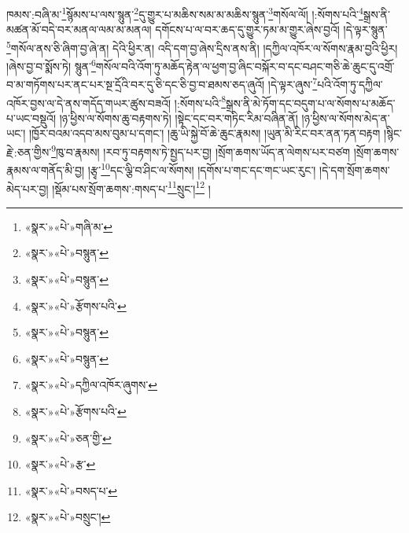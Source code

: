 ཁམས་:བཞི་མ་\footnote{«སྣར་»«པེ་»གཞི་མ་}སྙོམས་པ་ལས་སྙུན་\footnote{«སྣར་»«པེ་»བསྙུན་}དུ་གྱུར་པ་མཆིས་སམ་མ་མཆིས་སྙུན་\footnote{«སྣར་»«པེ་»བསྙུན་}གསོལ་ལོ། །:སོགས་པའི་\footnote{«སྣར་»«པེ་»རྩོགས་པའི་}སྒྲས་ནི་མཚན་མོ་བདེ་བར་མནལ་ལམ་མ་མནལ། དགོངས་པ་ལ་བར་ཆད་དུ་གྱུར་ཏམ་མ་གྱུར་ཞེས་བྱའོ། །དེ་ལྟར་སྙུན་\footnote{«སྣར་»«པེ་»བསྙུན་}གསོལ་ནས་ཅི་ཞིག་བྱ་ཞེ་ན། དེའི་ཕྱིར་ན། འདི་དག་བྱ་ཞེས་དྲིས་ནས་ནི། །དཀྱིལ་འཁོར་ལ་སོགས་རྣམ་བྱའི་ཕྱིར། །ཞེས་བྱ་བ་སྨོས་ཏེ། སྙུན་\footnote{«སྣར་»«པེ་»བསྙུན་}གསོལ་བའི་འོག་ཏུ་མཆོད་རྟེན་ལ་ཕྱག་བྱ་ཞིང་བསྐོར་བ་དང་བཤང་གཅི་ཆེ་ཆུང་དུ་འགྲོ་བ་མ་གཏོགས་པར་ནང་པར་སྔ་དྲོའི་བར་དུ་ཅི་དང་ཅི་བྱ་བ་ཐམས་ཅད་ཞུའོ། །དེ་ལྟར་ཞུས་\footnote{«སྣར་»«པེ་»དཀྱིལ་འཁོར་ཞུགས་}པའི་འོག་ཏུ་དཀྱིལ་འཁོར་བྱས་ལ་དེ་ནས་གདོད་གཡར་ཚུས་བཟའོ། །:སོགས་པའི་\footnote{«སྣར་»«པེ་»རྩོགས་པའི་}སྒྲས་ནི་མེ་ཏོག་དང་བདུག་པ་ལ་སོགས་པ་མཆོད་པ་ཡང་བསྡུའོ། །ཉ་ཕྱིས་ལ་སོགས་ཆུ་བརྟགས་ཏེ། །སྟེང་དང་བར་གཏིང་རིམ་བཞིན་ནོ། །ཉ་ཕྱིས་ལ་སོགས་མེད་ན་ཡང་། །ཁྱོར་བའམ་འདབ་མས་བུམ་པ་དགང་། །ཆུ་ཡི་སྐྱེ་བོ་ཆེ་ཆུང་རྣམས། །ཡུན་མི་རིང་བར་ནན་ཏན་བརྟག །སྙིང་རྗེ་:ཅན་གྱིས་\footnote{«སྣར་»«པེ་»ཅན་གྱི་}ཁུ་བ་རྣམས། །རབ་ཏུ་བརྟགས་ཏེ་སྤྱད་པར་བྱ། །སྲོག་ཆགས་ཡོད་ན་ལེགས་པར་བཙག །སྲོག་ཆགས་རྣམས་ལ་གནོད་མི་བྱ། །རྩྭ་\footnote{«སྣར་»«པེ་»རྩ་}དང་ལྕི་བ་ཤིང་ལ་སོགས། །དགོས་པ་གང་དང་གང་ཡང་རུང་། །དེ་དག་སྲོག་ཆགས་མེད་པར་བྱ། །སྡོམ་པས་སྲོག་ཆགས་:གསད་པ་\footnote{«སྣར་»«པེ་»བསད་པ་}སྲུང་།\footnote{«སྣར་»«པེ་»བསྲུང་།} །

